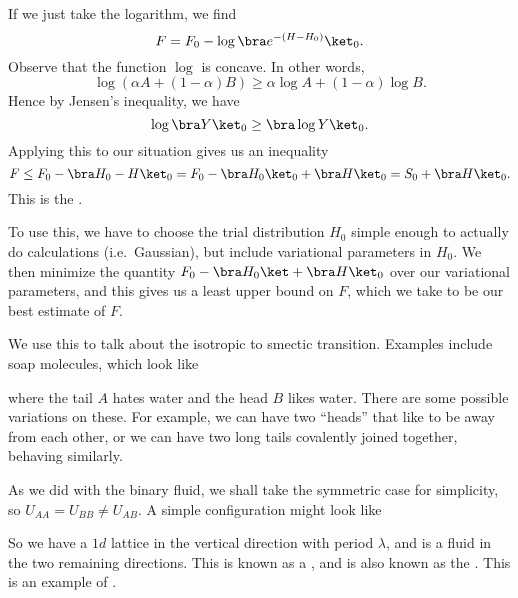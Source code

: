 \documentclass[a4paper]{article}
\begin{document}
If we just take the logarithm, we find
\[
  F = F_0 - \log \bra e^{-(H - H_0)}\ket_0.
\]
Observe that the function $\log$ is concave. In other words,
\[
  \log (\alpha A + (1 - \alpha) B) \geq \alpha \log A + (1 - \alpha) \log B.
\]
Hence by Jensen's inequality, we have
\[
  \log \bra Y \ket_0 \geq \bra \log Y \ket_0.
\]
Applying this to our situation gives us an inequality
\[
  F \leq F_0 - \bra H_0 - H\ket_0 = F_0 - \bra H_0\ket_0 + \bra H\ket_0 = S_0 + \bra H\ket_0.
\]
This is the .

To use this, we have to choose the trial distribution $H_0$ simple enough to actually do calculations (i.e.\ Gaussian), but include variational parameters in $H_0$. We then minimize the quantity $F_0 - \bra H_0\ket + \bra H\ket_0$ over our variational parameters, and this gives us a least upper bound on $F$, which we take to be our best estimate of $F$.

We use this to talk about the isotropic to smectic transition. Examples include soap molecules, which look like
\begin{center}
\end{center}
where the tail $A$ hates water and the head $B$ likes water. There are some possible variations on these. For example, we can have two ``heads'' that like to be away from each other, or we can have two long tails covalently joined together, behaving similarly.

As we did with the binary fluid, we shall take the symmetric case for simplicity, so $U_{AA} = U_{BB} \not= U_{AB}$. A simple configuration might look like

\begin{center}
\end{center}
So we have a $1d$ lattice in the vertical direction with period $\lambda$, and is a fluid in the two remaining directions. This is known as a , and is also known as the . This is an example of .
\end{document}
